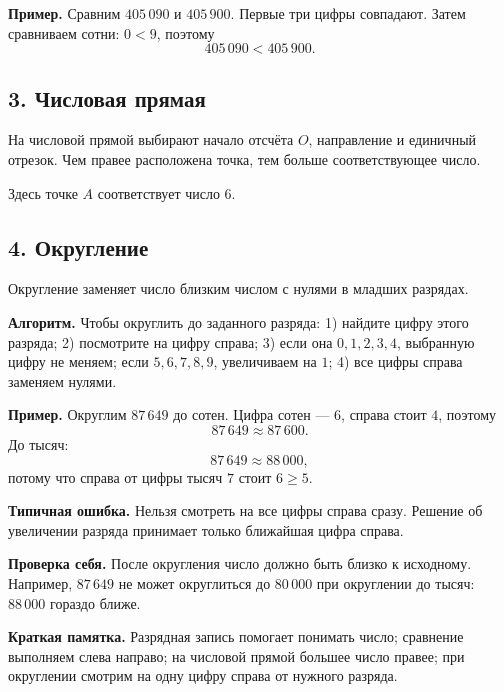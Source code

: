 \documentclass[12pt,a4paper]{article}
\newcommand{\algorithm}[1]{%
  \par\smallskip
  {\color{accent}\textbf{Алгоритм.}} #1\par\smallskip
}
\newcommand{\mistake}[1]{%
  \par\smallskip
  {\color{accent}\textbf{Типичная ошибка.}} #1\par\smallskip
}
\newcommand{\selfcheck}[1]{%
  \par\smallskip
  {\color{accent}\textbf{Проверка себя.}} #1\par\smallskip
}
\newcommand{\memo}[1]{%
  \par\smallskip
  \begingroup
  \setlength{\fboxsep}{7pt}%
  \colorbox{accentlight}{\parbox{0.94\textwidth}{\textbf{Краткая памятка.} #1}}%
  \endgroup
  \par\smallskip
}
\begin{document}
\textbf{Пример.} Сравним $405\,090$ и $405\,900$. Первые три цифры совпадают. Затем сравниваем сотни: $0<9$, поэтому
\[
405\,090<405\,900.
\]

\subsection*{3. Числовая прямая}
На числовой прямой выбирают начало отсчёта $O$, направление и единичный отрезок. Чем правее расположена точка, тем больше соответствующее число.

\begin{center}
\end{center}

Здесь точке $A$ соответствует число $6$.

\subsection*{4. Округление}
Округление заменяет число близким числом с нулями в младших разрядах.

\algorithm{Чтобы округлить до заданного разряда: 1) найдите цифру этого разряда; 2) посмотрите на цифру справа; 3) если она $0,1,2,3,4$, выбранную цифру не меняем; если $5,6,7,8,9$, увеличиваем на $1$; 4) все цифры справа заменяем нулями.}

\textbf{Пример.} Округлим $87\,649$ до сотен. Цифра сотен --- $6$, справа стоит $4$, поэтому
\[
87\,649\approx87\,600.
\]
До тысяч:
\[
87\,649\approx88\,000,
\]
потому что справа от цифры тысяч $7$ стоит $6\ge5$.

\mistake{Нельзя смотреть на все цифры справа сразу. Решение об увеличении разряда принимает только ближайшая цифра справа.}

\selfcheck{После округления число должно быть близко к исходному. Например, $87\,649$ не может округлиться до $80\,000$ при округлении до тысяч: $88\,000$ гораздо ближе.}

\memo{Разрядная запись помогает понимать число; сравнение выполняем слева направо; на числовой прямой большее число правее; при округлении смотрим на одну цифру справа от нужного разряда.}
\end{document}
